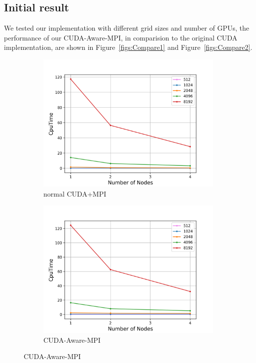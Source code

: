 \documentclass[article]{scrartcl}
\begin{document}
\subsection{Initial result}
We tested our implementation with different grid sizes and number of GPUs, the performance of our CUDA-Aware-MPI, in comparision to the original CUDA implementation, are shown in Figure~\ref{figs:Compare1} and Figure~\ref{figs:Compare2}. 
\begin{figure}[htpb!]
	\centering
	\begin{subfigure}{.48\textwidth}
		\includegraphics[width=\textwidth,keepaspectratio=true]{../figs/strongscalingCPU_CUDA.png}
		\caption{normal CUDA+MPI}
		\label{fig:StrongCpuCUDA}
	\end{subfigure}
	\begin{subfigure}{.48\textwidth}
		\centering
		\includegraphics[width=\textwidth,keepaspectratio=true]{../figs/strongscalingCPU.png}
		\caption{CUDA-Aware-MPI}
		\label{fig:StrongCpu}
	\end{subfigure}
	

\end{figure}
\end{document}

